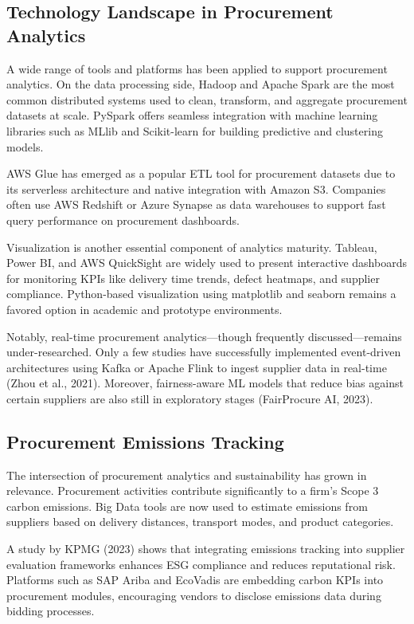 \documentclass[10pt, twocolumn]{article}
\begin{document}
\subsection{Technology Landscape in Procurement Analytics}
A wide range of tools and platforms has been applied to support procurement analytics. On the data processing side, Hadoop and Apache Spark are the most common distributed systems used to clean, transform, and aggregate procurement datasets at scale. PySpark offers seamless integration with machine learning libraries such as MLlib and Scikit-learn for building predictive and clustering models.

AWS Glue has emerged as a popular ETL tool for procurement datasets due to its serverless architecture and native integration with Amazon S3. Companies often use AWS Redshift or Azure Synapse as data warehouses to support fast query performance on procurement dashboards.

Visualization is another essential component of analytics maturity. Tableau, Power BI, and AWS QuickSight are widely used to present interactive dashboards for monitoring KPIs like delivery time trends, defect heatmaps, and supplier compliance. Python-based visualization using matplotlib and seaborn remains a favored option in academic and prototype environments.

Notably, real-time procurement analytics—though frequently discussed—remains under-researched. Only a few studies have successfully implemented event-driven architectures using Kafka or Apache Flink to ingest supplier data in real-time (Zhou et al., 2021). Moreover, fairness-aware ML models that reduce bias against certain suppliers are also still in exploratory stages (FairProcure AI, 2023).

\subsection{Procurement Emissions Tracking}
The intersection of procurement analytics and sustainability has grown in relevance. Procurement activities contribute significantly to a firm’s Scope 3 carbon emissions. Big Data tools are now used to estimate emissions from suppliers based on delivery distances, transport modes, and product categories.

A study by KPMG (2023) shows that integrating emissions tracking into supplier evaluation frameworks enhances ESG compliance and reduces reputational risk. Platforms such as SAP Ariba and EcoVadis are embedding carbon KPIs into procurement modules, encouraging vendors to disclose emissions data during bidding processes.
\end{document}

